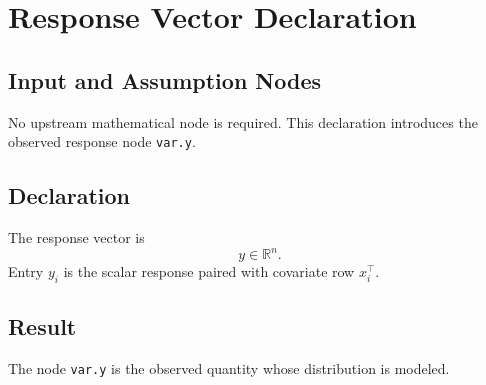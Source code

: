 \section{Response Vector Declaration}
\label{def:response-vector}

\subsection{Input and Assumption Nodes}
No upstream mathematical node is required. This declaration introduces the observed response node \texttt{var.y}.

\subsection{Declaration}
The response vector is
\[
  y \in \mathbb{R}^{n}.
\]
Entry \(y_i\) is the scalar response paired with covariate row \(x_i^\top\).

\subsection{Result}
The node \texttt{var.y} is the observed quantity whose distribution is modeled.

